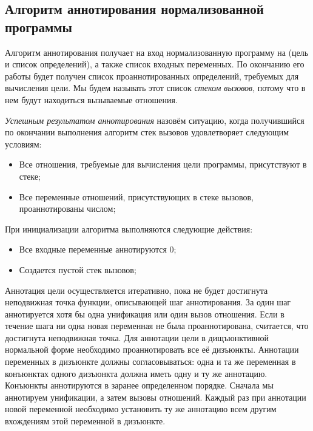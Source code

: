 \subsection{Алгоритм аннотирования нормализованной программы}

Алгоритм аннотирования получает на вход нормализованную программу на \miniKanren{} (цель и список определений), а также список входных переменных.
По окончанию его работы будет получен список проаннотированных определений, требуемых для вычисления цели.
Мы будем называть этот список \emph{стеком вызовов}, потому что в нем будут находиться вызываемые отношения.

\emph{Успешным результатом аннотирования} назовём ситуацию, когда получившийся по окончании выполнения алгоритм стек вызовов удовлетворяет следующим условиям:
\begin{itemize}
    \item Все отношения, требуемые для вычисления цели программы, присутствуют в стеке;
    \item Все переменные отношений, присутствующих в стеке вызовов, проаннотированы числом;
\end{itemize}

При инициализации алгоритма выполняются следующие действия: 
\begin{itemize}
    \item Все входные переменные аннотируются $0$;
    \item Создается пустой стек вызовов;
\end{itemize}

Аннотация цели осуществляется итеративно, пока не будет достигнута неподвижная точка функции, описывающей шаг аннотирования. 
За один шаг аннотируется хотя бы одна унификация или один вызов отношения.
Если в течение шага ни одна новая переменная не была проаннотирована, считается, что достигнута неподвижная точка.
Для аннотации цели в дищъюнктивной нормальной форме необходимо проаннотировать все её дизъюнкты. 
Аннотации переменных в дизъюнкте должны согласовываться: одна и та же переменная в конъюнктах одного дизъюнкта должна иметь одну и ту же аннотацию.
Конъюнкты аннотируются в заранее определенном порядке. 
Сначала мы аннотируем унификации, а затем вызовы отношений. 
Каждый раз при аннотации новой переменной необходимо установить ту же аннотацию всем другим вхождениям этой переменной в дизъюнкте. 

